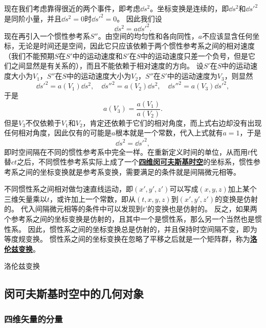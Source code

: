 \documentclass[UTF8, a4paper]{ctexart}
\newcommand*{\concept}[1]{\underline{\textbf{#1}}}
\begin{document}
现在我们考虑靠得很近的两个事件，即考虑$\dd{s^2}$。坐标变换是连续的，即$\dd{s^2}$和$\dd{s'^2}$是同阶小量，并且$\dd{s^2}=0$时$\dd{s'^2}=0$。
因此我们设
\[
    \dd{s^2} = a \dd{s'^2}.
\]
现在再引入一个惯性参考系$S''$。由空间的均匀性和各向同性，$a$不应该显含任何坐标，无论是时间还是空间，因此它只应该依赖于两个惯性参考系之间的相对速度（我们不能预期$S$在$S'$中的运动速度和$S'$在$S$中的运动速度只差一个负号，但是它们之间显然是有关系的），而且不能依赖于相对速度的方向。
设$S'$在$S$中的运动速度大小为$V_1$，$S''$在$S$中的运动速度大小为$V_2$，$S''$在$S'$中的运动速度为$V_3$，则显然
\[
    \dd{s'^2} = a(V_1) \dd{s^2}, \quad \dd{s''^2} = a(V_2) \dd{s^2}, \quad \dd{s''^2} = a(V_3) \dd{s'^2},
\]
于是
\[
    a(V_3) = \frac{a(V_1)}{a(V_2)}.
\]
但是$V_3$不仅依赖于$V_1$和$V_2$，肯定还依赖于它们的相对角度，而上式右边却没有出现任何相对角度，因此仅有的可能是$a$根本就是一个常数，代入上式就有$a = 1$，于是
\begin{equation}
    \dd{s^2} = \dd{s'^2},
\end{equation}
即时空间隔在不同的惯性参考系中完全一样。在重新定义时间的单位，从而用$t$代替$ct$之后，不同惯性参考系实际上成了一个\concept{四维闵可夫斯基时空}的坐标系，惯性参考系之间的坐标变换就是参考系变换，需要满足的条件就是间隔微元相等。

不同惯性系之间相对做匀速直线运动，即$(x', y', z')$可以写成$(x, y, z)$加上某个三维矢量乘以$t$，或许加上一个常数，即从$(t, x, y, z)$到$(x', y', z')$的变换是仿射的。
代入间隔微元相等的条件中可以发现到$t'$的变换也是仿射的。
反之，如果两个参考系之间的坐标变换是仿射的，且其中一个是惯性系，那么另一个当然也是惯性系。
因此，惯性系之间的坐标变换总是仿射的，并且保持时空间隔不变，即为等度规变换。
惯性系之间的坐标变换在忽略了平移之后就是一个矩阵群，称为\concept{洛伦兹变换}。

洛伦兹变换

\subsection{闵可夫斯基时空中的几何对象}

\subsubsection{四维矢量的分量}\label{sec:components-of-four-vector}
\end{document}
